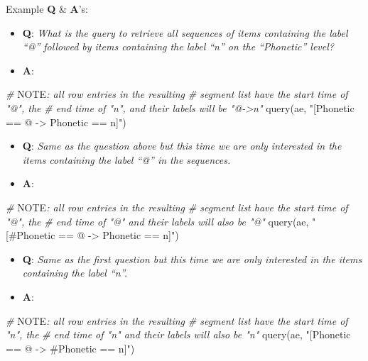 \documentclass[
]{book}
\newenvironment{Shaded}{\begin{snugshade}}{\end{snugshade}}
\newcommand{\AlertTok}[1]{\textcolor[rgb]{0.94,0.16,0.16}{#1}}
\newcommand{\CommentTok}[1]{\textcolor[rgb]{0.56,0.35,0.01}{\textit{#1}}}
\newcommand{\FunctionTok}[1]{\textcolor[rgb]{0.00,0.00,0.00}{#1}}
\newcommand{\NormalTok}[1]{#1}
\newcommand{\StringTok}[1]{\textcolor[rgb]{0.31,0.60,0.02}{#1}}
\providecommand{\tightlist}{%
  \setlength{\itemsep}{0pt}\setlength{\parskip}{0pt}}
\begin{document}
Example \textbf{Q} \& \textbf{A}'s:

\begin{itemize}
\tightlist
\item
  \textbf{Q}: \emph{What is the query to retrieve all sequences of items containing the label ``@'' followed by items containing the label ``n'' on the ``Phonetic'' level?}
\item
  \textbf{A}:
\end{itemize}

\begin{Shaded}
\begin{Highlighting}[]
\CommentTok{\# }\AlertTok{NOTE}\CommentTok{: all row entries in the resulting }
\CommentTok{\# segment list have the start time of "@", the }
\CommentTok{\# end time of "n", and their labels will be "@{-}\textgreater{}n"}
\FunctionTok{query}\NormalTok{(ae, }\StringTok{"[Phonetic == @ {-}\textgreater{} Phonetic == n]"}\NormalTok{)}
\end{Highlighting}
\end{Shaded}

\begin{itemize}
\tightlist
\item
  \textbf{Q}: \emph{Same as the question above but this time we are only interested in the items containing the label ``@'' in the sequences.}
\item
  \textbf{A}:
\end{itemize}

\begin{Shaded}
\begin{Highlighting}[]
\CommentTok{\# }\AlertTok{NOTE}\CommentTok{: all row entries in the resulting}
\CommentTok{\# segment list have the start time of "@", the}
\CommentTok{\# end time of "@" and their labels will also be "@"}
\FunctionTok{query}\NormalTok{(ae, }\StringTok{"[\#Phonetic == @ {-}\textgreater{} Phonetic == n]"}\NormalTok{)}
\end{Highlighting}
\end{Shaded}

\begin{itemize}
\tightlist
\item
  \textbf{Q}: \emph{Same as the first question but this time we are only interested in the items containing the label ``n''.}
\item
  \textbf{A}:
\end{itemize}

\begin{Shaded}
\begin{Highlighting}[]
\CommentTok{\# }\AlertTok{NOTE}\CommentTok{: all row entries in the resulting}
\CommentTok{\# segment list have the start time of "n", the}
\CommentTok{\# end time of "n" and their labels will also be "n"}
\FunctionTok{query}\NormalTok{(ae, }\StringTok{"[Phonetic == @ {-}\textgreater{} \#Phonetic == n]"}\NormalTok{)}
\end{Highlighting}
\end{Shaded}
\end{document}
